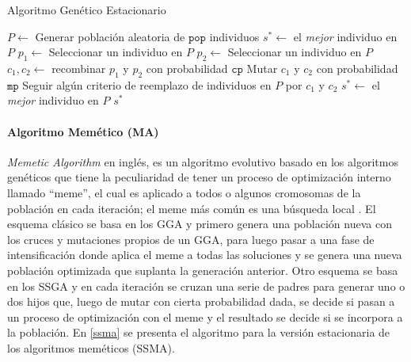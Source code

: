 \begin{algorithm}
\caption{Algoritmo Genético Estacionario}
\label{sga}
\begin{algorithmic}[1]


\State $P \gets$ Generar población aleatoria de $\texttt{pop}$ individuos
\State $s^* \gets $ el \emph{mejor} individuo en $P$
	\State $p_1 \gets$ Seleccionar un individuo en $P$
	\State $p_2 \gets$ Seleccionar un individuo en $P$
	\State $c_1, c_2 \gets $ recombinar $p_1$ y $p_2$ con probabilidad $\texttt{cp}$
	\State Mutar $c_1$ y $c_2$ con probabilidad $\texttt{mp}$
	\State Seguir algún criterio de reemplazo de individuos en $P$ por $c_1$ y $c_2$
		\State $s^* \gets$ el \emph{mejor} individuo en $P$
	\EndIf
\EndWhile
\State \Return $s^*$

\end{algorithmic}
\end{algorithm}

\paragraph{Algoritmo Memético (MA)}

\emph{Memetic Algorithm} en inglés, es un algoritmo evolutivo basado en los algoritmos genéticos que tiene la peculiaridad de tener un proceso de optimización interno llamado ``meme'', el cual es aplicado a todos o algunos cromosomas de la población en cada iteración; el meme más común es una búsqueda local \cite{neri2012memetic}. El esquema clásico se basa en los GGA y primero genera una población nueva con los cruces y mutaciones propios de un GGA, para luego pasar a una fase de intensificación donde aplica el meme a todas las soluciones y se genera una nueva población optimizada que suplanta la generación anterior. Otro esquema se basa en los SSGA y en cada iteración se cruzan una serie de padres para generar uno o dos hijos que, luego de mutar con cierta probabilidad dada, se decide si pasan a un proceso de optimización con el meme y el resultado se decide si se incorpora a la población.  En \ref{ssma} se presenta el algoritmo para la versión estacionaria de los algoritmos meméticos (SSMA).

